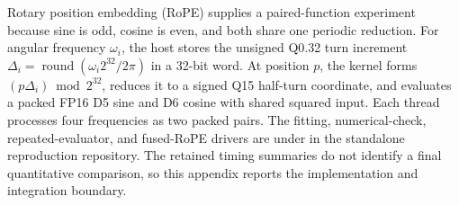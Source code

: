 Rotary position embedding (RoPE) supplies a paired-function experiment because
sine is odd, cosine is even, and both share one periodic reduction. For angular
frequency $\omega_i$, the host stores the unsigned Q0.32 turn increment
$\Delta_i=\operatorname{round}(\omega_i2^{32}/2\pi)$ in a 32-bit word. At
position $p$, the kernel forms $(p\Delta_i)\bmod 2^{32}$, reduces it to a signed
Q15 half-turn coordinate, and evaluates a packed FP16 D5 sine and D6 cosine with
shared squared input. Each thread processes four frequencies as two packed
pairs. The fitting, numerical-check, repeated-evaluator, and fused-RoPE drivers
are under  in the standalone reproduction repository.
The retained timing summaries do not identify a final quantitative comparison,
so this appendix reports the implementation and integration boundary.

\FloatBarrier
